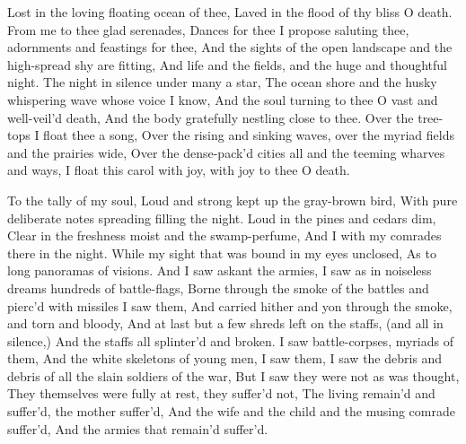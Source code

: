 \documentclass[11pt]{book}
\newenvironment {poem} [1]
 {\titulus{#1}%
  \versus
  \Nstanza{0}%
  \numerus{1}}
 {\endversus}
\begin{document}
\begin{poem}{When Lilacs Last in the Dooryard Bloom'd}
{Lost in the loving floating ocean of thee,
Laved in the flood of thy bliss O death.
     \vacua
From me to thee glad serenades,
Dances for thee I propose saluting thee, adornments and feastings for thee,
And the sights of the open landscape and the high-spread shy are fitting,
And life and the fields, and the huge and thoughtful night.
     \vacua
The night in silence under many a star,
The ocean shore and the husky whispering wave whose voice I know,
And the soul turning to thee O vast and well-veil'd death,
And the body gratefully nestling close to thee.
     \vacua
Over the tree-tops I float thee a song,
Over the rising and sinking waves, over the myriad fields and the %
    prairies wide,
Over the dense-pack'd cities all and the teeming wharves and ways,
I float this carol with joy, with joy to thee O death.
}
\stropha %

To the tally of my soul,
Loud and strong kept up the gray-brown bird,
With pure deliberate notes spreading filling the night.
     \vacua
Loud in the pines and cedars dim,
Clear in the freshness moist and the swamp-perfume,
And I with my comrades there in the night.
     \vacua
While my sight that was bound in my eyes unclosed,
As to long panoramas of visions.
     \vacua
And I saw askant the armies,
I saw as in noiseless dreams hundreds of battle-flags,
Borne through the smoke of the battles and pierc'd with missiles I saw them,
And carried hither and yon through the smoke, and torn and bloody,
And at last but a few shreds left on the staffs, (and all in silence,)
And the staffs all splinter'd and broken.
     \vacua
I saw battle-corpses, myriads of them,
And the white skeletons of young men, I saw them,
I saw the debris and debris of all the slain soldiers of the war,
But I saw they were not as was thought,
They themselves were fully at rest, they suffer'd not,
The living remain'd and suffer'd, the mother suffer'd,
And the wife and the child and the musing comrade suffer'd,
And the armies that remain'd suffer'd.

\stropha %


\end{poem}
\end{document}
